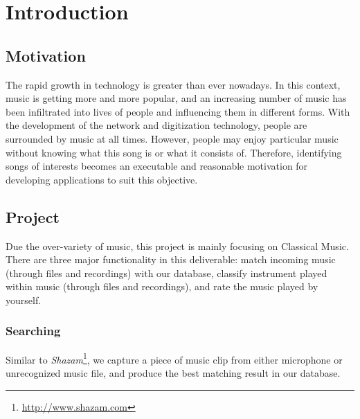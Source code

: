 \documentclass[whitelogo,12pt]{tudelft-report}
\begin{document}
\let\cleardoublepage\clearpage

%

\tableofcontents

\mainmatter

%
%

\chapter{Introduction}
\section{Motivation}
The rapid growth in technology is greater than ever nowadays. In this context, music is getting more and more popular, and an increasing number of music has been infiltrated into lives of people and influencing them in different forms. With the development of the network and digitization technology, people are surrounded by music at all times. However, people may enjoy particular music without knowing what this song is or what it consists of. Therefore, identifying songs of interests becomes an executable and reasonable motivation for developing applications to suit this objective.

\section{Project}
Due the over-variety of music, this project is mainly focusing on Classical Music. There are three major functionality in this deliverable: match incoming music (through files and recordings) with our database, classify instrument played within music (through files and recordings), and rate the music played by yourself.

\subsection{Searching}
Similar to \textit{Shazam}\footnote{\url{http://www.shazam.com}}, we capture a piece of music clip from either microphone or unrecognized music file, and produce the best matching result in our database.
\end{document}
